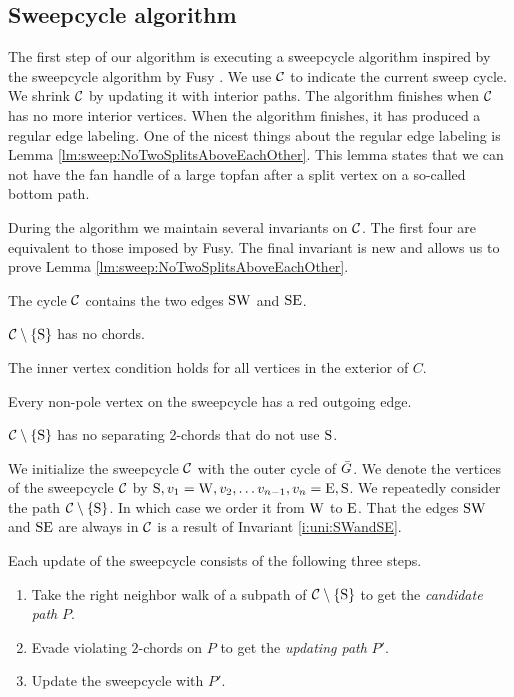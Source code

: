 
\subsection{Sweepcycle algorithm}
\thispagestyle{plain}
\label{ss:sweep}
The first step of our algorithm is executing a sweepcycle algorithm inspired by the sweepcycle algorithm by Fusy \cite{Fusy2006}. We use $\mathcal{C}$ to indicate the current sweep cycle. We shrink $\mathcal{C}$ by updating it with interior paths.
The algorithm finishes when $\mathcal{C}$ has no more interior vertices. When the algorithm finishes, it has produced a regular edge labeling.
One of the nicest things about the regular edge labeling is Lemma \ref{lm:sweep:NoTwoSplitsAboveEachOther}.
This lemma states that we can not have the fan handle of a large topfan after a split vertex on a so-called bottom path.

During the algorithm we maintain several invariants on $\mathcal{C}$. The first four are equivalent to those imposed by Fusy. The final invariant is new and allows us to prove Lemma \ref{lm:sweep:NoTwoSplitsAboveEachOther}.

\begin{invariants}
  \itemsep=-4pt
  \item \label{i:uni:SWandSE} The cycle $\mathcal{C}$ contains the two edges $\mathrm{S} \mathrm{W}$ and $\mathrm{S} \mathrm{E}$.
  \item \label{i:uni:noChords} $\mathcal{C} \setminus \left\lbrace {\mathrm{S}} \right\rbrace$ has no chords.
  \item \label{i:uni:intVertCond} The inner vertex condition holds for all vertices in the exterior of $C$.
  \item \label{i:uni:redOutgoing} Every non-pole vertex on the sweepcycle has a red outgoing edge.
  \item \label{i:uni:no2Chords} $\mathcal{C}\setminus \left\lbrace {\mathrm{S}} \right\rbrace$ has no separating 2-chords that do not use $\mathrm{S}$.
\end{invariants}

We initialize the sweepcycle $\mathcal{C}$ with the outer cycle of $\bar{G}$.
We denote the vertices of the sweepcycle $\mathcal{C}$ by $\mathrm{S}, v_1 = \mathrm{W}, v_2, \ldots v_{n-1}, v_n = \mathrm{E}, \mathrm{S}$.
We repeatedly consider the path $\mathcal{C} \setminus \left\lbrace {\mathrm{S}} \right\rbrace$.
In which case we order it from $\mathrm{W}$ to $\mathrm{E}$. That the edges $\mathrm{S} \mathrm{W}$ and $\mathrm{S} \mathrm{E}$ are always in $\mathcal{C}$ is a result of Invariant \ref{i:uni:SWandSE}.


Each update of the sweepcycle consists of the following three steps.
\begin{enumerate}
  \itemsep=-4pt
  \item Take the right neighbor walk of a subpath of $\mathcal{C} \setminus \left\lbrace {\mathrm{S}} \right\rbrace$ to get the \emph{candidate path} $P$.
  \item Evade violating $2$-chords on $P$ to get the \emph{updating path} $P'$.
  \item Update the sweepcycle with $P'$.
\end{enumerate}

